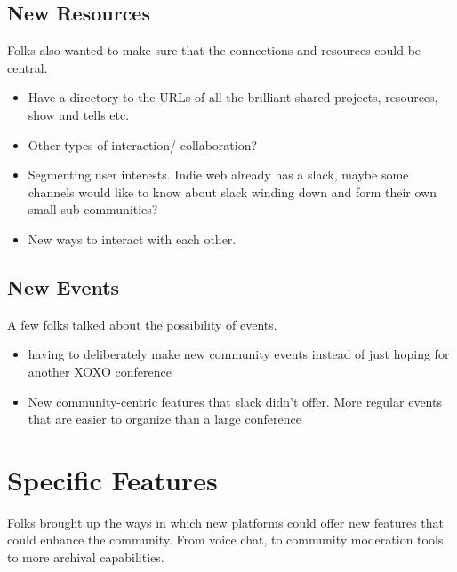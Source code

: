 \documentclass[
]{book}
\providecommand{\tightlist}{%
  \setlength{\itemsep}{0pt}\setlength{\parskip}{0pt}}
\begin{document}
\subsection{New Resources}\label{new-resources}

Folks also wanted to make sure that the connections and resources could be central.

\begin{itemize}
\tightlist
\item
  Have a directory to the URLs of all the brilliant shared projects, resources, show and tells etc.
\item
  Other types of interaction/ collaboration?
\item
  Segmenting user interests. Indie web already has a slack, maybe some channels would like to know about slack winding down and form their own small sub communities?
\item
  New ways to interact with each other.
\end{itemize}

\subsection{New Events}\label{new-events}

A few folks talked about the possibility of events.

\begin{itemize}
\tightlist
\item
  having to deliberately make new community events instead of just hoping for another XOXO conference
\item
  New community-centric features that slack didn't offer. More regular events that are easier to organize than a large conference
\end{itemize}

\section{Specific Features}\label{specific-features}

Folks brought up the ways in which new platforms could offer new features that could enhance the community. From voice chat, to community moderation tools to more archival capabilities.
\end{document}
